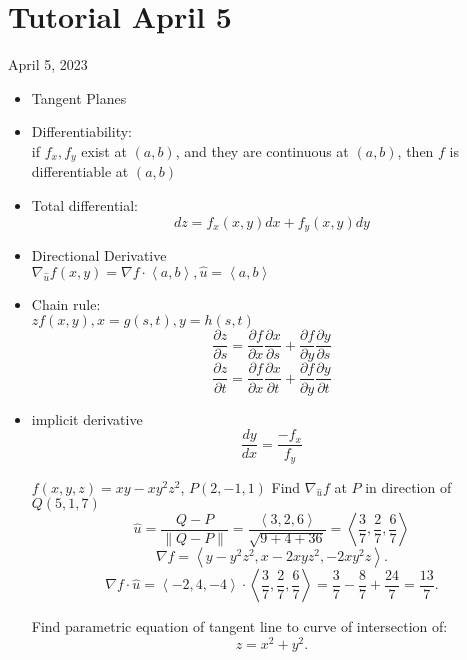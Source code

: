 \section{Tutorial April 5}
April 5, 2023
\begin{itemize}
	\item Tangent Planes
	\item Differentiability:\\
		if $f_x, f_y$ exist at $(a,b)$, and they are continuous at $(a,b)$, then $f$ is differentiable at $(a,b)$\\
	\item Total differential:\\
		$$dz = f_x\left( x,y \right) dx + f_y\left( x,y \right) dy$$
	\item Directional Derivative\\
		$\nabla_{\hat{u}} f\left( x,y \right) = \nabla f \cdot \left<a,b \right>, \hat{u} = \left< a, b \right>$\\
	\item Chain rule:\\
		$ z f\left( x,y \right) , x = g\left( s,t \right) , y = h\left( s,t \right) $ \\
		\[
		\frac{\partial z}{\partial s}  = \frac{\partial f}{\partial x} \frac{\partial x}{\partial s}  + \frac{\partial f}{\partial y} \frac{\partial y}{\partial s} 
		\] \[
		\frac{\partial z}{\partial t}  = \frac{\partial f}{\partial x} \frac{\partial x}{\partial t} + \frac{\partial f}{\partial y} \frac{\partial y}{\partial t} 
		\] 
	\item implicit derivative
		\[
			\frac{dy}{dx} = \frac{-f_x}{f_y}
		\] 
		\begin{example}
			$f\left( x,y,z \right)  = xy - xy^2z^2$, $P\left( 2,-1,1 \right) $ Find $\nabla _{\hat{u}}f$ at $P$ in direction of $Q\left( 5,1,7 \right) $ \\
			\[
			\hat{u} = \frac{Q - P}{\lVert Q - P \rVert } = \frac{\left< 3,2,6\right>}{\sqrt{9 + 4 + 36} } = \left<\frac{3}{7}, \frac{2}{7}, \frac{6}{7} \right>
			\]
			\[
			\nabla f = \left<y - y^2z^2, x - 2xyz^2, -2xy^2z \right>
			.\] 
			\[
			\nabla f \cdot \hat{u} = \left<-2, 4, -4\right> \cdot \left<\frac{3}{7}, \frac{2}{7}, \frac{6}{7} \right> = \frac{3}{7} - \frac{8}{7} + \frac{24}{7} = \frac{13}{7}
			.\] 
		\end{example}
		\begin{example}
			Find parametric equation of tangent line to curve of intersection of:\\
			\[
			z = x^2 + y^2
			.\] 

\end{example}
\end{itemize}
